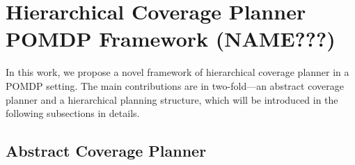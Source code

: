 \documentclass{article}
\begin{document}




\section{Hierarchical Coverage Planner POMDP Framework (NAME???)}



In this work, we propose a novel framework of hierarchical coverage planner in a POMDP setting.
The main contributions are in two-fold---an abstract coverage planner and a hierarchical planning structure, which will be introduced in the following subsections in details.


\subsection{Abstract Coverage Planner} 

\end{document}
